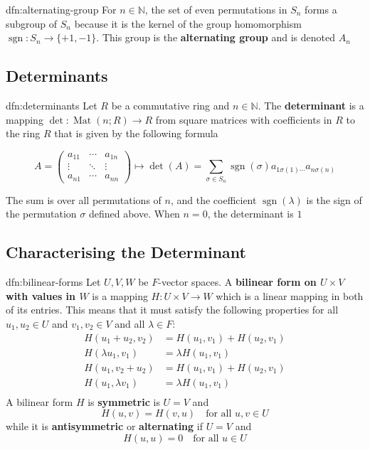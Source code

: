 \documentclass[landscape, 8pt]{extarticle}
\DeclareMathOperator{\sgn}{sgn}
\DeclareMathOperator{\Mat}{Mat}
\begin{document}
\begin{multicols}{3}
\begin{dfn}{dfn:alternating-group}{}
    For $n\in \mathbb{N}$, the set of even permutations in $S_{n}$ forms a subgroup of $S_{n}$ because it is the kernel of the group homomorphism $\sgn : S_{n}\to \{+1, -1\}$. This group is the \textbf{alternating group} and is denoted $A_{n}$
\end{dfn}

\subsection{Determinants}

\begin{dfn}{dfn:determinants}{}
    Let $R$ be a commutative ring and $n\in \mathbb{N}$. The \textbf{determinant} is a mapping $\det : \Mat(n;R) \to R$ from square matrices with coefficients in $R$ to the ring $R$ that is given by the following formula

    \[A = \begin{pmatrix}
        a_{11} & \cdots & a_{1n}\\
        \vdots & \ddots & \vdots\\
        a_{n1} & \cdots & a_{nn}
    \end{pmatrix} \mapsto \det(A) = \sum_{\sigma\in S_{n}} \sgn(\sigma) a_{1\sigma(1)\cdots}  a_{n\sigma(n)}\]

    The sum is over all permutations of $n$, and the coefficient $\sgn(\lambda)$ is the sign of the permutation $\sigma$ defined above. When $n = 0$, the determinant is $1$
\end{dfn}

\newpage
\subsection{Characterising the Determinant}

\begin{dfn}{dfn:bilinear-forms}{}
    Let $U,V,W$ be $F$-vector spaces. A \textbf{bilinear form on $U \times V$ with values in $W$} is a mapping $H: U \times V \to W $ which is a linear mapping in both of its entries. This means that it must satisfy the following properties for all $u_{1}, u_{2}\in U$ and $v_{1}, v_{2}\in V$ and all $\lambda\in F$:
    \begin{align*}
        H(u_{1} + u_{2}, v_{2}) &= H(u_{1}, v_{1}) + H(u_{2}, v_{1})\\
        H(\lambda u_{1}, v_{1}) &= \lambda H(u_{1}, v_{1}) \\
        H(u_{1}, v_{2} + u_{2}) &= H(u_{1}, v_{1}) + H(u_{2}, v_{1})\\
        H(u_{1},\lambda v_{1}) &= \lambda H(u_{1}, v_{1}) \\
    \end{align*}
    A bilinear form $H$ is \textbf{symmetric} is $U = V$ and
    \[H(u,v) = H(v,u)\quad \text{for all } u,v\in U\]
    while it is \textbf{antisymmetric} or \textbf{alternating} if $U = V$ and
    \[H(u, u) = 0 \quad\text{for all } u\in U\]


\end{dfn}
\end{multicols}
\end{document}
